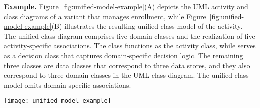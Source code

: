 \noindent\textbf{Example.} 
Figure~\ref{fig:unified-model-example}(A) depicts the UML activity and class diagrams of a \courseman variant that manages enrollment, while Figure~\ref{fig:unified-model-example}(B) illustrates the resulting unified class model of the activity. The unified class diagram comprises five domain classes and the realization of five activity-specific associations. The  class functions as the activity class, while  serves as a decision class that captures domain-specific decision logic. The remaining three classes are data classes that correspond to three data stores, and they also correspond to three domain classes in the UML class diagram. The unified class model omits domain-specific associations.
\begin{figure*}[]
	\begin{center}
		\texttt{[image: unified-model-example]}
	\end{center}
	\caption{(A: Left) The UML activity and class diagrams of a \courseman~software variant that handles the enrollment management activity; (B: Right) The unified class model that results.} %
	\label{fig:unified-model-example}
\end{figure*} 
